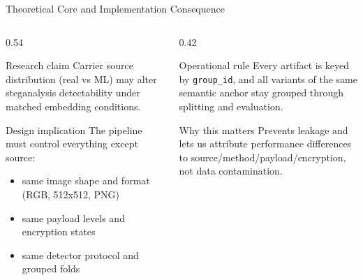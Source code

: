 \documentclass[aspectratio=169,11pt]{beamer}
\begin{document}
\begin{frame}{Theoretical Core and Implementation Consequence}
\small
\begin{columns}[T]
\begin{column}{0.54\textwidth}
\begin{block}{Research claim}
Carrier source distribution (real vs ML) may alter steganalysis detectability under matched embedding conditions.
\end{block}
\begin{block}{Design implication}
The pipeline must control everything except source:
\begin{itemize}
\item same image shape and format (RGB, 512x512, PNG)
\item same payload levels and encryption states
\item same detector protocol and grouped folds
\end{itemize}
\end{block}
\end{column}
\begin{column}{0.42\textwidth}
\begin{alertblock}{Operational rule}
\small
Every artifact is keyed by \texttt{group\_id}, and all variants of the same semantic anchor stay grouped through splitting and evaluation.
\end{alertblock}
\begin{exampleblock}{Why this matters}
\small
Prevents leakage and lets us attribute performance differences to source/method/payload/encryption, not data contamination.
\end{exampleblock}
\end{column}
\end{columns}
\end{frame}
\end{document}

